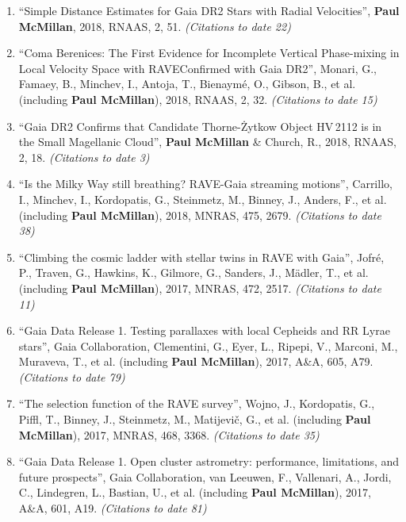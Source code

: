 \documentclass{resume}
\begin{document}
\begin{enumerate}
\item ``Simple Distance Estimates for Gaia DR2 Stars with Radial Velocities'', \textbf{Paul McMillan}, 2018, RNAAS, 2, 51. \textit{(Citations to date 22)}

\item ``Coma Berenices: The First Evidence for Incomplete Vertical Phase-mixing in Local Velocity Space with RAVE{\textemdash}Confirmed with Gaia DR2'', Monari, G., Famaey, B., Minchev, I., Antoja, T., Bienaym\'e, O., Gibson, B., et al. (including \textbf{Paul McMillan}), 2018, RNAAS, 2, 32. \textit{(Citations to date 15)}

\item ``Gaia DR2 Confirms that Candidate Thorne-\.Zytkow Object HV\,2112 is in the Small Magellanic Cloud'', \textbf{Paul McMillan} \& Church, R., 2018, RNAAS, 2, 18. \textit{(Citations to date 3)}

\item ``Is the Milky Way still breathing? RAVE-Gaia streaming motions'', Carrillo, I., Minchev, I., Kordopatis, G., Steinmetz, M., Binney, J., Anders, F., et al. (including \textbf{Paul McMillan}), 2018, MNRAS, 475, 2679. \textit{(Citations to date 38)}

\item ``Climbing the cosmic ladder with stellar twins in RAVE with Gaia'', Jofr\'e, P., Traven, G., Hawkins, K., Gilmore, G., Sanders, J., M\"adler, T., et al. (including \textbf{Paul McMillan}), 2017, MNRAS, 472, 2517. \textit{(Citations to date 11)}

\item ``Gaia Data Release 1. Testing parallaxes with local Cepheids and RR Lyrae stars'', Gaia Collaboration, Clementini, G., Eyer, L., Ripepi, V., Marconi, M., Muraveva, T., et al. (including \textbf{Paul McMillan}), 2017, A\&A, 605, A79. \textit{(Citations to date 79)}

\item ``The selection function of the RAVE survey'', Wojno, J., Kordopatis, G., Piffl, T., Binney, J., Steinmetz, M., Matijevi\v{c}, G., et al. (including \textbf{Paul McMillan}), 2017, MNRAS, 468, 3368. \textit{(Citations to date 35)}

\item ``Gaia Data Release 1. Open cluster astrometry: performance, limitations, and future prospects'', Gaia Collaboration, van Leeuwen, F., Vallenari, A., Jordi, C., Lindegren, L., Bastian, U., et al. (including \textbf{Paul McMillan}), 2017, A\&A, 601, A19. \textit{(Citations to date 81)}


\end{enumerate}
\end{document}
